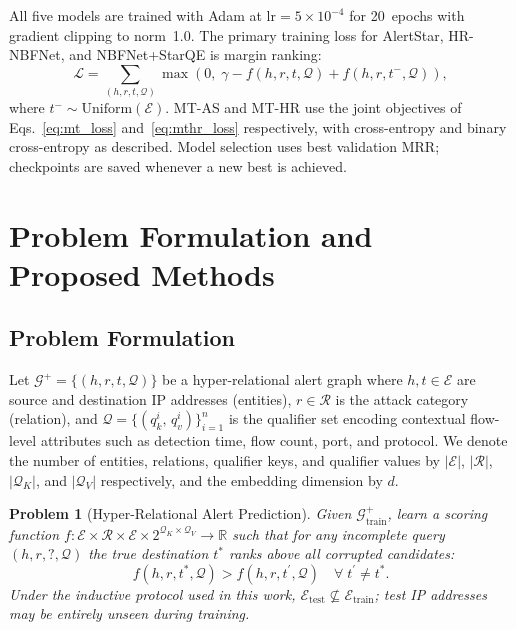 \documentclass[10pt,journal,compsoc]{IEEEtran}
\newtheorem{problem}{Problem}
\begin{document}
All five models are trained with Adam at
$\mathrm{lr} = 5\times10^{-4}$ for 20~epochs with gradient
clipping to norm~1.0.
The primary training loss for AlertStar, HR-NBFNet, and
NBFNet+StarQE is margin ranking:
\begin{equation}
  \mathcal{L}
  = \sum_{(h,r,t,\mathcal{Q})}
    \max\!\left(0,\;
      \gamma
      - f(h,r,t,\mathcal{Q})
      + f(h,r,t^-,\mathcal{Q})
    \right),
  \label{eq:margin_loss}
\end{equation}
where $t^- \sim \mathrm{Uniform}(\mathcal{E})$.
MT-AS and MT-HR use the joint objectives of
Eqs.~\eqref{eq:mt_loss} and~\eqref{eq:mthr_loss}
respectively, with cross-entropy and binary cross-entropy
as described.
Model selection uses best validation MRR; checkpoints are
saved whenever a new best is achieved.

\fi

\iffalse
\section{Problem Formulation and Proposed Methods}
\label{sec:models}

\subsection{Problem Formulation}
\label{ssec:problem}

Let $\mathcal{G}^{+} = \{(h, r, t, \mathcal{Q})\}$ be a
hyper-relational alert graph where $h, t \in \mathcal{E}$
are source and destination IP addresses (entities),
$r \in \mathcal{R}$ is the attack category (relation), and
$\mathcal{Q} = \{(q_k^i,\, q_v^i)\}_{i=1}^{n}$
is the qualifier set encoding contextual flow-level attributes
such as detection time, flow count, port, and protocol.
We denote the number of entities, relations,
qualifier keys, and qualifier values by
$|\mathcal{E}|$, $|\mathcal{R}|$, $|\mathcal{Q}_K|$,
and $|\mathcal{Q}_V|$ respectively, and the embedding
dimension by $d$.

\begin{problem}[Hyper-Relational Alert Prediction]
\label{prob:hralert}
Given $\mathcal{G}^{+}_{\mathrm{train}}$, learn a scoring
function
$f \colon \mathcal{E} \times \mathcal{R} \times \mathcal{E}
     \times 2^{\mathcal{Q}_K \times \mathcal{Q}_V}
     \rightarrow \mathbb{R}$
such that for any incomplete query $(h, r, ?, \mathcal{Q})$
the true destination $t^{*}$ ranks above all corrupted
candidates:
\begin{equation}
  f(h, r, t^{*}, \mathcal{Q})
  > f(h, r, t^{\prime}, \mathcal{Q})
  \quad \forall\; t^{\prime} \neq t^{*}.
  \label{eq:ranking_obj}
\end{equation}
Under the \emph{inductive protocol} used in this work,
$\mathcal{E}_{\mathrm{test}}
 \not\subseteq \mathcal{E}_{\mathrm{train}}$;
test IP addresses may be entirely unseen during training.
\end{problem}
\end{document}
